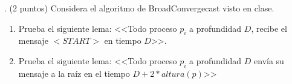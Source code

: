 . (2 puntos) Considera el algoritmo de BroadConvergecast visto en clase.

\begin{enumerate}
	\item Prueba el siguiente lema: <<Todo proceso $p_i$ a profundidad $D$, recibe el mensaje $<START>$ en tiempo $D$>>.
	
	\item Prueba el siguiente lema: <<Todo proceso $p_i$ a profundidad $D$ envía su mensaje a la raíz en el tiempo $D+2*altura(p)$>>
\end{enumerate}
